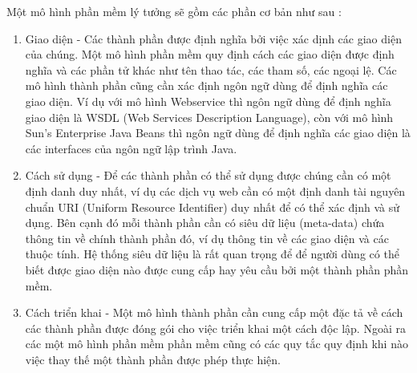 Một mô hình phần mềm lý tưởng sẽ gồm các phần cơ bản như sau :

\begin{enumerate}
  \item Giao diện - Các thành phần được định nghĩa bởi việc xác dịnh các giao diện của chúng. Một mô hình phần mềm quy định cách các giao diện được định nghĩa và các phần tử khác như tên thao tác, các tham số, các ngoại lệ. Các mô hình thành phần cũng cần xác định ngôn ngữ dùng để định nghĩa các giao diện. Ví dụ với mô hình Webservice thì ngôn ngữ dùng để định nghĩa giao diện là WSDL (Web Services Description Language), còn với mô hình Sun’s  Enterprise  Java  Beans thì ngôn ngữ dùng để định nghĩa các giao diện là các interfaces của ngôn ngữ lập trình Java.
	\item Cách sử dụng - Để các thành phần có thể sử dụng được chúng cần có một định danh duy nhất, ví dụ các dịch vụ web cần có một định danh tài nguyên chuẩn URI (Uniform Resource Identifier) duy nhất để có thể xác định và sử dụng. Bên cạnh đó mỗi thành phần cần có siêu dữ liệu (meta-data) chứa thông tin về chính thành phần đó, ví dụ thông tin về các giao diện và các thuộc tính. Hệ thống siêu dữ liệu là rất quan trọng để để người dùng có thể biết được giao diện nào được cung cấp hay yêu cầu bởi một thành phần phần mềm.
	\item Cách triển khai - Một mô hình thành phần cần cung cấp một đặc tả về cách các thành phần được đóng gói cho việc triển khai một cách độc lập. Ngoài ra các một mô hình phần mềm phần mềm cũng có các quy tắc quy định khi nào việc thay thế một thành phần được phép thực hiện. 
	
\end{enumerate}


